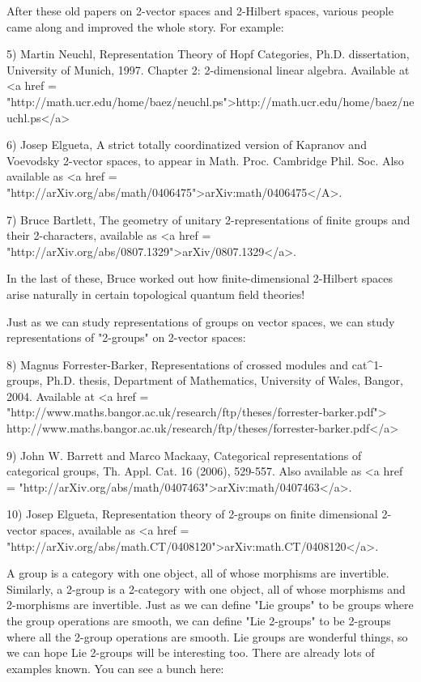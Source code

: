 After these old papers on 2-vector spaces and 2-Hilbert spaces,
various people came along and improved the whole story.  For example:

5) Martin Neuchl, Representation Theory of Hopf Categories,
Ph.D. dissertation, University of Munich, 1997.  Chapter 2:
2-dimensional linear algebra.  Available at <a href =
"http://math.ucr.edu/home/baez/neuchl.ps">http://math.ucr.edu/home/baez/neuchl.ps</a>

6) Josep Elgueta, A strict totally coordinatized version of Kapranov
and Voevodsky 2-vector spaces, to appear in Math. Proc.  Cambridge
Phil. Soc.  Also available as <a href =
"http://arXiv.org/abs/math/0406475">arXiv:math/0406475</A>.

7) Bruce Bartlett, The geometry of unitary 2-representations of finite
groups and their 2-characters, available as <a href =
"http://arXiv.org/abs/0807.1329">arXiv/0807.1329</a>.

In the last of these, Bruce worked out how finite-dimensional 
2-Hilbert spaces arise naturally in certain topological 
quantum field theories! 

Just as we can study representations of groups on vector spaces, we
can study representations of "2-groups" on 2-vector spaces:

8) Magnus Forrester-Barker, Representations of crossed modules and
cat^{1}-groups, Ph.D. thesis, Department of Mathematics,
University of Wales, Bangor, 2004.  Available at <a href =
"http://www.maths.bangor.ac.uk/research/ftp/theses/forrester-barker.pdf">
http://www.maths.bangor.ac.uk/research/ftp/theses/forrester-barker.pdf</a>

9) John W. Barrett and Marco Mackaay, Categorical representations of
categorical groups, Th. Appl. Cat. 16 (2006), 529-557.  Also available
as <a href =
"http://arXiv.org/abs/math/0407463">arXiv:math/0407463</a>.

10) Josep Elgueta, Representation theory of 2-groups on finite
dimensional 2-vector spaces, available as <a href =
"http://arXiv.org/abs/math.CT/0408120">arXiv:math.CT/0408120</a>.

A group is a category with one object, all of whose morphisms are
invertible.  Similarly, a 2-group is a 2-category with one object, all
of whose morphisms and 2-morphisms are invertible.  Just as we can
define "Lie groups" to be groups where the group operations
are smooth, we can define "Lie 2-groups" to be 2-groups
where all the 2-group operations are smooth.  Lie groups are wonderful
things, so we can hope Lie 2-groups will be interesting too.  There
are already lots of examples known.  You can see a bunch here:

